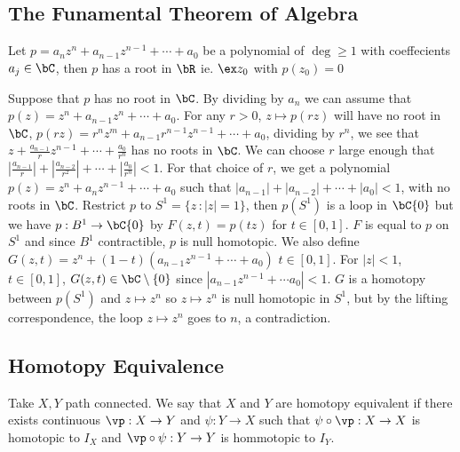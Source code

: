 
\subsection{The Funamental Theorem of Algebra}

\begin{theorem}
    Let $p = a_nz^n + a_{n-1}z^{n-1} + \cdots + a_0$ be a polynomial of $\deg \ge 1$ with coeffecients $a_j \in \bC$, then $p$ has a root in $\bR$ ie. $\ex z_0$ with $p(z_0)=0$
\end{theorem}

\begin{pf}
    Suppose that $p$ has no root in $\bC$. By dividing by $a_n$ we can assume that $p(z) = z^n + a_{n-1}z^n + \cdots + a_0$. For any $r>0$, $z \mapsto p(rz)$ will have no root in $\bC$, $p(rz) = r^nz^m + a_{n-1}r^{n-1}z^{n-1} + \cdots + a_0$, dividing by $r^n$, we see that $z + \frac{a_{n-1}}{r}z^{n-1} + \cdots + \frac{a_0}{r^n}$ has no roots in $\bC$. We can choose $r$ large enough that $\left| \frac{a_{n-1}}{r} \right| + \left| \frac{a_{n-2}}{r^2} \right| + \cdots + \left| \frac{a_0}{r^n} \right| < 1$. For that choice of $r$, we get a polynomial $p(z) = z^n + a_nz^{n-1} + \cdots + a_0$ such that $|a_{n-1}| + |a_{n-2}| +  \cdots + |a_0| < 1$, with no roots in $\bC$. Restrict $p$ to $S^1 = \{ z \, : |z| = 1\}$, then $p(S^1)$ is a loop in $\bC \{0\}$ but we have $p: B^1 \to \bC\{0\}$ by $F(z,t) = p(tz)$ for $t \in [0,1]$. $F$ is equal to $p$ on $S^1$ and since $B^1$ contractible, $p$ is null homotopic. We also define $G(z,t) = z^n + (1-t)(a_{n-1}z^{n-1} + \cdots + a_0)$ $t \in [0,1]$. For $|z| < 1$, $t \in [0,1]$, $G(z,t) \in \bC \setminus \{0\}$ since $|a_{n-1}z^{n-1} + \cdots a_0| < 1$. $G$ is a homotopy between $p(S^1)$ and $z \mapsto z^n$ so $z \mapsto z^n$ is null homotopic in $S^1$, but by the lifting correspondence, the loop $z \mapsto z^n$ goes to $n$, a contradiction. 
\end{pf}

\subsection{Homotopy Equivalence}

\begin{definition}
    Take $X,Y$ path connected. We say that $X$ and $Y$ are homotopy equivalent if there exists continuous $\vp: X \to Y$ and $\psi: Y \to X$ such that $\psi \circ \vp: X \to X$ is homotopic to $I_X$ and $\vp \circ \psi: Y \to Y$ is hommotopic to $I_Y$. 
\end{definition}

